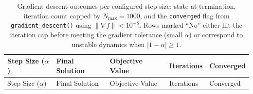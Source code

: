 \documentclass[
]{article}
\begin{document}
\begin{longtable}[]{@{}
  >{\raggedright\arraybackslash}p{}
  >{\raggedright\arraybackslash}p{}
  >{\raggedright\arraybackslash}p{}
  >{\raggedright\arraybackslash}p{}
  >{\raggedright\arraybackslash}p{}@{}}
\caption{Gradient descent outcomes per configured step size: state at
termination, iteration count capped by \(N_{\max} = 1000\), and the
\protect\texttt{converged} flag from
\protect\texttt{gradient\_descent()} using \(\|\nabla f\| < 10^{-8}\).
Rows marked ``No'' either hit the iteration cap before meeting the
gradient tolerance (small \(\alpha\)) or correspond to unstable dynamics
when \(|1-\alpha| \geq 1\).}\label{tbl:opt_results}\tabularnewline
\toprule\noalign{}
\begin{minipage}[b]{\linewidth}\raggedright
Step Size (\texorpdfstring{\ensuremath{\alpha}}{alpha})
\end{minipage} & \begin{minipage}[b]{\linewidth}\raggedright
Final Solution
\end{minipage} & \begin{minipage}[b]{\linewidth}\raggedright
Objective Value
\end{minipage} & \begin{minipage}[b]{\linewidth}\raggedright
Iterations
\end{minipage} & \begin{minipage}[b]{\linewidth}\raggedright
Converged
\end{minipage} \\
\midrule\noalign{}
\endfirsthead
\toprule\noalign{}
\begin{minipage}[b]{\linewidth}\raggedright
Step Size (\texorpdfstring{\ensuremath{\alpha}}{alpha})
\end{minipage} & \begin{minipage}[b]{\linewidth}\raggedright
Final Solution
\end{minipage} & \begin{minipage}[b]{\linewidth}\raggedright
Objective Value
\end{minipage} & \begin{minipage}[b]{\linewidth}\raggedright
Iterations
\end{minipage} & \begin{minipage}[b]{\linewidth}\raggedright
Converged
\end{minipage} \\

\end{longtable}
\end{document}
